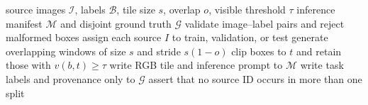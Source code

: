 \begin{algorithm}[t]
\caption{Source-safe preparation}
\label{alg:prepare}
\begin{algorithmic}[1]
\Require source images $\mathcal{I}$, labels $\mathcal{B}$, tile size $s$,
overlap $o$, visible threshold $\tau$
\Ensure inference manifest $\mathcal{M}$ and disjoint ground truth $\mathcal{G}$
\State validate image--label pairs and reject malformed boxes
\State assign each source $I$ to train, validation, or test
  \State generate overlapping windows of size $s$ and stride $s(1-o)$
    \State clip boxes to $t$ and retain those with $v(b,t)\geq\tau$
    \State write RGB tile and inference prompt to $\mathcal{M}$
    \State write task labels and provenance only to $\mathcal{G}$
  \EndFor
\EndFor
\State assert that no source ID occurs in more than one split
\end{algorithmic}
\end{algorithm}
